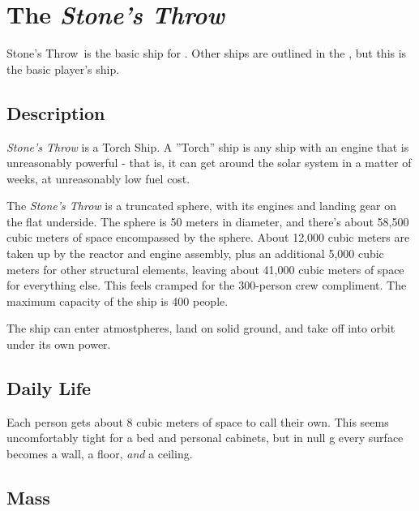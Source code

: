 \newcommand{\shipname}{Stone's Throw}

\section{The \textit{\shipname}}
\shipname\, is the basic ship for \getTitleShort . Other ships are outlined in the \shipBookTitle , but this is the basic player's ship.

\subsection{Description}
\par
\textit{Stone's Throw} is a Torch Ship. A ''Torch'' ship is any ship with an engine that is unreasonably powerful - that is, it can get around the solar system in a matter of weeks, at unreasonably low fuel cost.

\par
The \textit{Stone's Throw} is a truncated sphere, with its engines and landing gear on the flat underside. The sphere is 50 meters in diameter, and there's about 58,500 cubic meters of space encompassed by the sphere. About 12,000 cubic meters are taken up by the reactor and engine assembly, plus an additional 5,000 cubic meters for other structural elements, leaving about 41,000 cubic meters of space for everything else. This feels cramped for the 300-person crew compliment. The maximum capacity of the ship is 400 people.

\par
The ship can enter atmostpheres, land on solid ground, and take off into orbit under its own power.

\subsection{Daily Life}
\par
Each person gets about 8 cubic meters of space to call their own. This seems uncomfortably tight for a bed and personal cabinets, but in null g every surface becomes a wall, a floor, \textit{and} a ceiling.

\subsection{Mass}

